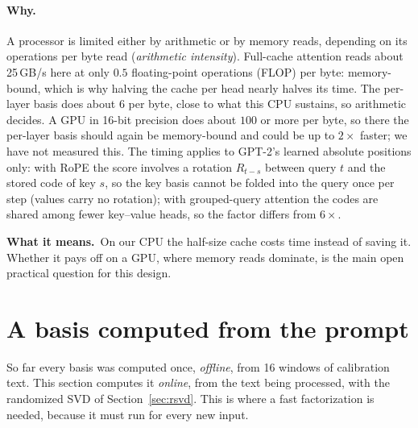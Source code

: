 \documentclass[10pt]{article}
\theoremstyle{plain}
\theoremstyle{definition}
\theoremstyle{remark}
\newcommand{\means}{\noindent\textbf{What it means.}\ }
\begin{document}
\paragraph{Why.}
A processor is limited either by arithmetic or by memory reads, depending on its operations per byte read (\emph{arithmetic intensity}). Full-cache attention reads about 25\,GB/s here at only $0.5$ floating-point operations (FLOP) per byte: memory-bound, which is why halving the cache per head nearly halves its time. The per-layer basis does about $6$ per byte, close to what this CPU sustains, so arithmetic decides. A GPU in 16-bit precision does about $100$ or more per byte, so there the per-layer basis should again be memory-bound and could be up to $2\times$ faster; we have not measured this. The timing applies to GPT-2's learned absolute positions only: with RoPE the score involves a rotation $R_{t-s}$ between query $t$ and the stored code of key $s$, so the key basis cannot be folded into the query once per step (values carry no rotation); with grouped-query attention the codes are shared among fewer key--value heads, so the factor differs from $6\times$.

\means On our CPU the half-size cache costs time instead of saving it. Whether it pays off on a GPU, where memory reads dominate, is the main open practical question for this design.


\section{A basis computed from the prompt}
\label{sec:kvonline}

So far every basis was computed once, \emph{offline}, from 16 windows of calibration text. This section computes it \emph{online}, from the text being processed, with the randomized SVD of Section~\ref{sec:rsvd}. This is where a fast factorization is needed, because it must run for every new input.
\end{document}
